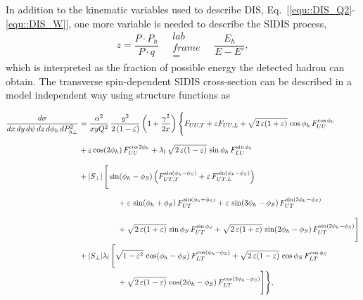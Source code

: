 In addition to the kinematic variables used to describe DIS,
Eq.~[\ref{equ::DIS_Q2}-\ref{equ::DIS_W}], one more variable is needed to
describe the SIDIS process,
\begin{equation}
  z = \frac{P \cdot P_h}{P \cdot q} \quad \substack{lab \\frame\\ =} \quad
  \frac{E_h}{E-E'},
\end{equation}
\noindent
which is interpreted as the fraction of possible energy the detected hadron
can obtain.  The transverse spin-dependent SIDIS cross-section can be described
in a model independent way using structure functions as~\cite{Bacchetta:2006tn}

\begin{align}
  \frac{d\sigma}{dx \, dy\, d\psi \,dz\, d\phi_h\, d P_{h\perp}^2} &=
  \frac{\alpha^2}{x y Q^2}\,
  \frac{y^2}{2\,(1-\varepsilon)}\,  \biggl( 1+\frac{\gamma^2}{2x} \biggr)\,
  \Biggl\{
  F_{UU ,T}
  + 
  \varepsilon
  F_{UU ,L}
  + \sqrt{2\,\varepsilon (1+\varepsilon)}\,\cos\phi_h\,
  F_{UU}^{\cos\phi_h}
  \nonumber \\  & 
  + \varepsilon \cos(2\phi_h)\, 
  F_{UU}^{\cos 2\phi_h}
  + \lambda_l\, \sqrt{2\,\varepsilon (1-\varepsilon)}\, 
  \sin\phi_h\, 
  F_{LU}^{\sin\phi_h}
  \phantom{\Bigg[ \Bigg] }
  \nonumber \\  & 
  + |S_\perp|\, \Bigg[
    \sin(\phi_h-\phi_S)\,
    \Bigl(F_{UT ,T}^{\sin\left(\phi_h -\phi_S\right)}
    + \varepsilon\, F_{UT ,L}^{\sin\left(\phi_h -\phi_S\right)}\Bigr)
    \nonumber \\  & \quad  \qquad \qquad
    + \varepsilon\, \sin(\phi_h+\phi_S)\, 
    F_{UT}^{\sin\left(\phi_h +\phi_S\right)}
    + \varepsilon\, \sin(3\phi_h-\phi_S)\,
    F_{UT}^{\sin\left(3\phi_h -\phi_S\right)}
    \phantom{\Bigg[ \Bigg] }
    \nonumber \\  & \quad \qquad \qquad
    + \sqrt{2\,\varepsilon (1+\varepsilon)}\, 
    \sin\phi_S\, 
    F_{UT}^{\sin \phi_S }
    + \sqrt{2\,\varepsilon (1+\varepsilon)}\, 
    \sin(2\phi_h-\phi_S)\,  
    F_{UT}^{\sin\left(2\phi_h -\phi_S\right)}
    \Bigg]
  \nonumber \\  &
  + |S_\perp| \lambda_l\, \Bigg[
    \sqrt{1-\varepsilon^2}\, \cos(\phi_h-\phi_S)\, 
    F_{LT}^{\cos(\phi_h -\phi_S)}
    +\sqrt{2\,\varepsilon (1-\varepsilon)}\, 
    \cos\phi_S\, 
    F_{LT}^{\cos \phi_S}
    \nonumber \\  & \quad \qquad \qquad
    +\sqrt{2\,\varepsilon (1-\varepsilon)}\, 
    \cos(2\phi_h-\phi_S)\,  
    F_{LT}^{\cos(2\phi_h - \phi_S)}
    \Bigg] \Biggr\},
  \label{equ::SIDISxsect}
\end{align}
